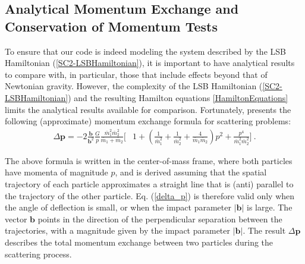 \documentclass[aps,onecolumn,notitlepage,eqsecnum,nofootinbib,floatfix,superscriptaddress]{revtex4-1}
\begin{document}
%
%
\subsection{Analytical Momentum Exchange and Conservation of Momentum Tests}
\label{sec_analytical}

To ensure that our code is indeed modeling the system described by the LSB Hamiltonian (\ref{SC2-LSBHamiltonian}), it is important to have analytical results to compare with, in particular, those that include effects beyond that of Newtonian gravity. However, the complexity of the LSB Hamiltonian (\ref{SC2-LSBHamiltonian}) and the resulting Hamilton equations \ref{HamiltonEquations} limits the analytical results available for comparison. Fortunately, \cite{PM} presents the following (approximate) momentum exchange formula for scattering problems:
\begin{equation}
\begin{aligned} \label{delta_p}
\Delta \textbf{p} = -2\frac{{\textbf{b}}}{{\textbf{b}}^2} \frac{G}{p}
\frac{\bar{m}_1^2 \bar{m}_2^2}{\bar{m}_1 + \bar{m}_2 }
\biggl[&
1+\left(\frac{1}{\bar{m}_1^2}+\frac{1}{\bar{m}_2^2}+\frac{4}{\bar{m}_1 \bar{m}_2} \right){p}^2 + \frac{{p}^4}{\bar{m}_1^2 \bar{m}_2^2 }
\biggr]~.
\end{aligned}
\end{equation}

\noindent The above formula is written in the center-of-mass frame, where both particles have momenta of magnitude $p$, and is derived assuming that the spatial trajectory of each particle approximates a straight line that is (anti) parallel to the trajectory of the other particle. Eq. (\ref{delta_p}) is therefore valid only when the angle of deflection is small, or when the impact parameter $|\textbf{b}|$ is large. The vector $\textbf{b}$ points in the direction of the perpendicular separation between the trajectories, with a magnitude given by the impact parameter $|\textbf{b}|$. The result $\Delta \textbf{p}$ describes the total momentum exchange between two particles during the scattering process.
\end{document}

